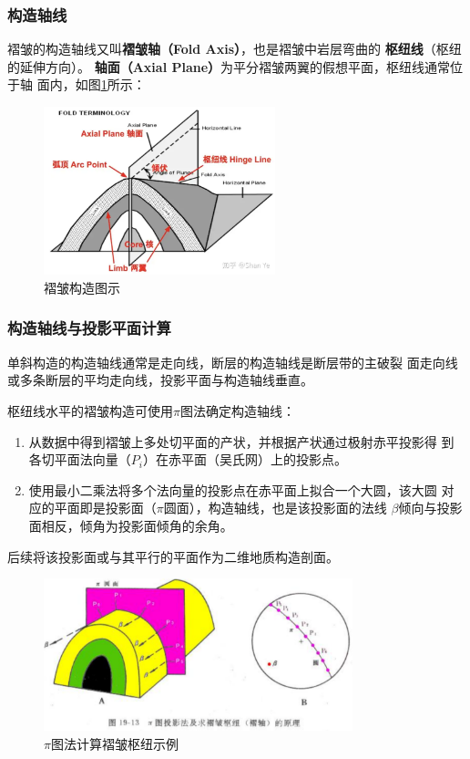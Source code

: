 \documentclass[a4paper,twoside]{ctexart}
\begin{document}
\subsubsection{构造轴线}

褶皱的构造轴线又叫\textbf{褶皱轴（Fold Axis）}，也是褶皱中岩层弯曲的
\textbf{枢纽线}（枢纽的延伸方向）。
\textbf{轴面（Axial Plane）}为平分褶皱两翼的假想平面，枢纽线通常位于轴
面内，如图\ref{fig:褶皱构造图示}所示：

\begin{figure}[htbp]
  \centering
    \includegraphics[width=0.6\textwidth]{pic/褶皱构造图示.png}
  \caption{褶皱构造图示}
  \label{fig:褶皱构造图示}
\end{figure}

\subsubsection{构造轴线与投影平面计算}
\label{sec:构造轴线与投影平面计算}
单斜构造的构造轴线通常是走向线，断层的构造轴线是断层带的主破裂
面走向线或多条断层的平均走向线，投影平面与构造轴线垂直。

枢纽线水平的褶皱构造可使用$\pi$图法确定构造轴线：
\begin{enumerate}
\item 从数据中得到褶皱上多处切平面的产状，并根据产状通过极射赤平投影得
  到各切平面法向量（$P_i$）在赤平面（吴氏网）上的投影点。 
\item 使用最小二乘法将多个法向量的投影点在赤平面上拟合一个大圆，该大圆
  对应的平面即是投影面（$\pi$圆面），构造轴线，也是该投影面的法线
  $\beta$倾向与投影面相反，倾角为投影面倾角的余角。
\end{enumerate}

后续将该投影面或与其平行的平面作为二维地质构造剖面。
 \begin{figure}[htbp]
  \centering
    \includegraphics[width=0.8\textwidth]{pic/图解法求褶皱枢纽.png}
  \caption{$\pi$图法计算褶皱枢纽示例}
  \label{fig:图解法求褶皱枢纽}
\end{figure}
\end{document}
